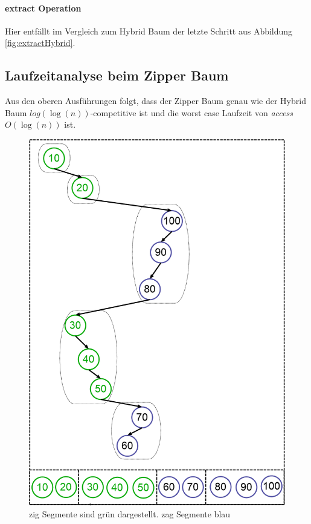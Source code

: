 \documentclass[a4paper,12pt]{article}
\begin{document}
\paragraph{extract Operation}
Hier entfällt im Vergleich zum Hybrid Baum der letzte Schritt aus Abbildung \ref{fig:extractHybrid}.\\


\subsection{Laufzeitanalyse beim Zipper Baum}
Aus den oberen Ausführungen folgt, dass der Zipper Baum genau wie der Hybrid Baum $log\left(\log\left(n\right)\right)$-competitive ist und die worst case Laufzeit von \textit{access} $O\left(\log\left(n\right)\right)$ ist.  
 
\begin{figure}[h]
	\centering
	\includegraphics[height= 0.7\textwidth]{"Medien/Zipper/preferredPathZigZag"}
	\caption{zig Segmente sind grün dargestellt. zag Segmente blau }
	\label{fig:preferredPathZigZag}
\end{figure}
\newpage


\end{document}
